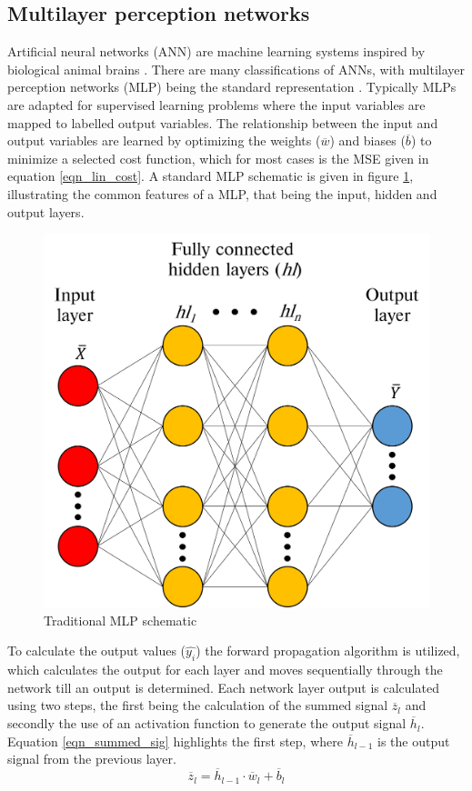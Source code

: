 \documentclass[a4paper,fleqn]{cas-sc}
\begin{document}
\subsection{Multilayer perception networks}
Artificial neural networks (ANN) are machine learning systems inspired by biological animal brains \cite{Rasmussen2006}. There are many classifications of ANNs, with multilayer perception networks (MLP) being the standard representation \citep{goodfellow}. Typically MLPs are adapted for supervised learning problems where the input variables are mapped to labelled output variables. The relationship between the input and output variables are learned by optimizing the weights ($\overline{w}$) and biases ($\overline{b}$) to minimize a selected cost function, which for most cases is the MSE given in equation \ref{eqn_lin_cost}. A standard MLP schematic is given in figure \ref{fig_mlp_schematic}, illustrating the common features of a MLP, that being the input, hidden and output layers.\\
\begin{figure}[h!]
	\centering
		\includegraphics[scale=0.5]{ML_SCHEMATIC}
	  \caption{Traditional MLP schematic}\label{fig_mlp_schematic}
\end{figure}

To calculate the output values ($\hat{y_i}$) the forward propagation algorithm is utilized, which calculates the output for each layer and moves sequentially through the network till an output is determined. Each network layer output is calculated using two steps, the first being the calculation of the summed signal $\overline{z}_l$ and secondly the use of an activation function to generate the output signal $\overline{h}_l$. Equation \ref{eqn_summed_sig} highlights the first step, where $\overline{h}_{l-1}$ is the output signal from the previous layer.
\begin{equation}\label{eqn_summed_sig}
\overline{z}_l = \overline{h}_{l-1}\cdot\overline{w}_l+\overline{b}_l
\end{equation}
\end{document}
